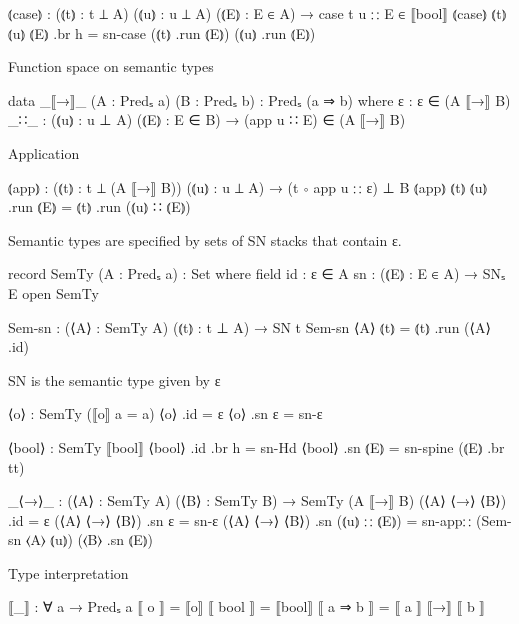 \begin{code}
⦅case⦆  :  (⦅t⦆ : t ⊥ A)
           (⦅u⦆ : u ⊥ A)
           (⦅E⦆ : E ∈ A)
        →  case t u ∷ E ∈ ⟦bool⟧
⦅case⦆ ⦅t⦆ ⦅u⦆ ⦅E⦆ .br h = sn-case (⦅t⦆ .run ⦅E⦆) (⦅u⦆ .run ⦅E⦆)
\end{code}

Function space on semantic types

\begin{code}
data _⟦→⟧_ (A : Predₛ a) (B : Predₛ b) : Predₛ (a ⇒ b) where
  ε    : ε ∈ (A ⟦→⟧ B)
  _∷_  : (⦅u⦆ : u ⊥ A) (⦅E⦆ : E ∈ B) → (app u ∷ E) ∈ (A ⟦→⟧ B)
\end{code}

Application

\begin{code}
⦅app⦆  :  (⦅t⦆ : t ⊥ (A ⟦→⟧ B))
          (⦅u⦆ : u ⊥ A)
       →  (t ∘ app u ∷ ε) ⊥ B
⦅app⦆ ⦅t⦆ ⦅u⦆ .run ⦅E⦆ = ⦅t⦆ .run (⦅u⦆ ∷ ⦅E⦆)
\end{code}


Semantic types are specified by sets of SN stacks that contain ε.

\begin{code}
record SemTy (A : Predₛ a) : Set where
  field
    id  : ε ∈ A
    sn  : (⦅E⦆ : E ∈ A) → SNₛ E
open SemTy

Sem-sn : (⟨A⟩ : SemTy A) (⦅t⦆ : t ⊥ A) → SN t
Sem-sn ⟨A⟩ ⦅t⦆ = ⦅t⦆ .run (⟨A⟩ .id)
\end{code}


SN is the semantic type given by {ε}

\begin{code}
⟨o⟩ : SemTy (⟦o⟧ {a = a})
⟨o⟩ .id    = ε
⟨o⟩ .sn ε  = sn-ε

⟨bool⟩ : SemTy ⟦bool⟧
⟨bool⟩ .id .br h  = sn-Hd
⟨bool⟩ .sn  ⦅E⦆    = sn-spine (⦅E⦆ .br tt)

_⟨→⟩_ : (⟨A⟩ : SemTy A) (⟨B⟩ : SemTy B) → SemTy (A ⟦→⟧ B)
(⟨A⟩ ⟨→⟩ ⟨B⟩) .id            = ε
(⟨A⟩ ⟨→⟩ ⟨B⟩) .sn ε          = sn-ε
(⟨A⟩ ⟨→⟩ ⟨B⟩) .sn (⦅u⦆ ∷ ⦅E⦆)  = sn-app∷ (Sem-sn ⟨A⟩ ⦅u⦆) (⟨B⟩ .sn ⦅E⦆)
\end{code}


Type interpretation

\begin{code}
⟦_⟧ : ∀ a → Predₛ a
⟦ o ⟧      = ⟦o⟧
⟦ bool ⟧   = ⟦bool⟧
⟦ a ⇒ b ⟧  = ⟦ a ⟧ ⟦→⟧ ⟦ b ⟧
\end{code}

